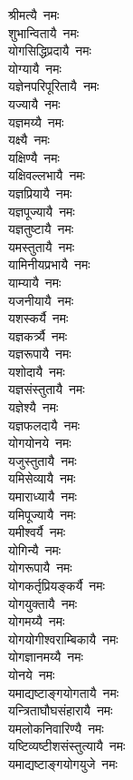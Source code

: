 \begin{flushleft}
\begin{multicols}{2}
श्रीमत्यै~नमः\hfill{}\\
शुभान्वितायै~नमः\\
योगसिद्धिप्रदायै~नमः\\
योग्यायै~नमः\\
यज्ञेनपरिपूरितायै~नमः\\
यज्यायै~नमः\\
यज्ञमय्यै~नमः\\
यक्ष्यै~नमः\\
यक्षिण्यै~नमः\\
यक्षिवल्लभायै~नमः\\
यज्ञप्रियायै~नमः\hfill{}\\
यज्ञपूज्यायै~नमः\\
यज्ञतुष्टायै~नमः\\
यमस्तुतायै~नमः\\
यामिनीयप्रभायै~नमः\\
याम्यायै~नमः\\
यजनीयायै~नमः\\
यशस्कर्यै~नमः\\
यज्ञकर्त्र्यै~नमः\\
यज्ञरूपायै~नमः\\
यशोदायै~नमः\hfill{}\\
यज्ञसंस्तुतायै~नमः\\
यज्ञेश्यै~नमः\\
यज्ञफलदायै~नमः\\
योगयोनये~नमः\\
यजुस्तुतायै~नमः\\
यमिसेव्यायै~नमः\\
यमाराध्यायै~नमः\\
यमिपूज्यायै~नमः\\
यमीश्वर्यै~नमः\\
योगिन्यै~नमः\hfill{}\\
योगरूपायै~नमः\\
योगकर्तृप्रियङ्कर्यै~नमः\\
योगयुक्तायै~नमः\\
योगमय्यै~नमः\\
योगयोगीश्वराम्बिकायै~नमः\\
योगज्ञानमय्यै~नमः\\
योनये~नमः\\
यमाद्यष्टाङ्गयोगतायै~नमः\\
यन्त्रिताघौघसंहारायै~नमः\\
यमलोकनिवारिण्यै~नमः\hfill{}\\
यष्टिव्यष्टीशसंस्तुत्यायै~नमः\\
यमाद्यष्टाङ्गयोगयुजे~नमः\\

\end{multicols}
\end{flushleft}
